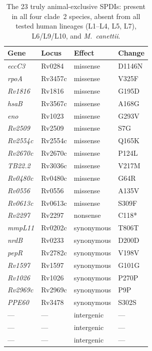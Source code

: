 \documentclass[11pt,a4paper]{article}
\begin{document}
\begin{table}[h]
\centering
\caption{The 23 truly animal-exclusive SPDIs: present in all four clade~2
species, absent from all tested human lineages (L1--L4, L5, L7),
L6/L9/L10, and \textit{M.~canettii}.}
\label{tab:truly_exclusive}
\begin{tabular}{@{}llll@{}}
\toprule
\textbf{Gene} & \textbf{Locus} & \textbf{Effect} & \textbf{Change} \\
\midrule
\textit{eccC3}  & Rv0284  & missense  & D1146N \\
\textit{rpoA}   & Rv3457c & missense  & V325F \\
\textit{Rv1816} & Rv1816  & missense  & G195D \\
\textit{hsaB}   & Rv3567c & missense  & A168G \\
\textit{eno}    & Rv1023  & missense  & G293V \\
\textit{Rv2509} & Rv2509  & missense  & S7G \\
\textit{Rv2554c}& Rv2554c & missense  & Q165K \\
\textit{Rv2670c}& Rv2670c & missense  & P124L \\
\textit{TB22.2} & Rv3036c & missense  & V217M \\
\textit{Rv0480c}& Rv0480c & missense  & G64R \\
\textit{Rv0556} & Rv0556  & missense  & A135V \\
\textit{Rv0613c}& Rv0613c & missense  & S309F \\
\textit{Rv2297} & Rv2297  & nonsense  & C118* \\
\textit{mmpL11} & Rv0202c & synonymous & T806T \\
\textit{nrdB}   & Rv0233  & synonymous & D200D \\
\textit{pepR}   & Rv2782c & synonymous & V198V \\
\textit{Rv1597} & Rv1597  & synonymous & G101G \\
\textit{Rv1026} & Rv1026  & synonymous & P270P \\
\textit{Rv2969c}& Rv2969c & synonymous & P9P \\
\textit{PPE60}  & Rv3478  & synonymous & S302S \\
---             & ---     & intergenic & --- \\
---             & ---     & intergenic & --- \\
---             & ---     & intergenic & --- \\
\bottomrule
\end{tabular}
\end{table}
\end{document}
